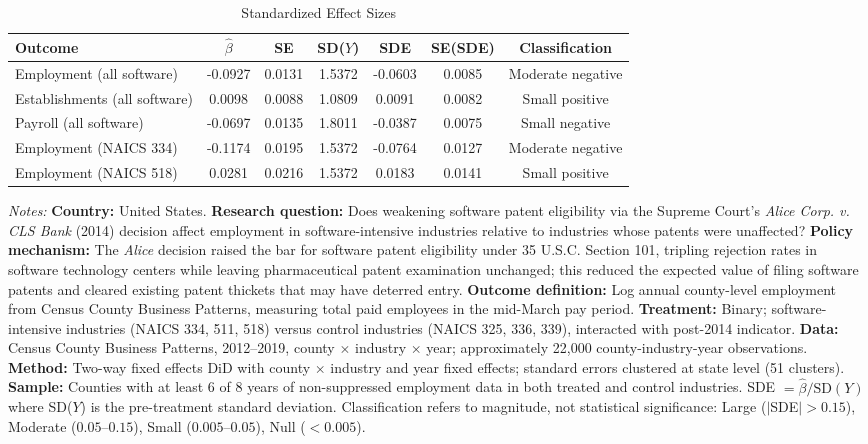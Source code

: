 \begin{table}[t]
\centering
\caption{Standardized Effect Sizes}
\label{tab:sde}
\footnotesize
\begin{tabular}{lcccccc}
\toprule
Outcome & $\hat{\beta}$ & SE & SD($Y$) & SDE & SE(SDE) & Classification \\
\midrule
Employment (all software) & -0.0927 & 0.0131 & 1.5372 & -0.0603 & 0.0085 & Moderate negative \\
Establishments (all software) & 0.0098 & 0.0088 & 1.0809 & 0.0091 & 0.0082 & Small positive \\
Payroll (all software) & -0.0697 & 0.0135 & 1.8011 & -0.0387 & 0.0075 & Small negative \\
Employment (NAICS 334) & -0.1174 & 0.0195 & 1.5372 & -0.0764 & 0.0127 & Moderate negative \\
Employment (NAICS 518) & 0.0281 & 0.0216 & 1.5372 & 0.0183 & 0.0141 & Small positive \\
\bottomrule
\end{tabular}
\begin{tablenotes}
\item \textit{Notes:} \textbf{Country:} United States. \textbf{Research question:} Does weakening software patent eligibility via the Supreme Court's \textit{Alice Corp. v. CLS Bank} (2014) decision affect employment in software-intensive industries relative to industries whose patents were unaffected? \textbf{Policy mechanism:} The \textit{Alice} decision raised the bar for software patent eligibility under 35 U.S.C. Section 101, tripling rejection rates in software technology centers while leaving pharmaceutical patent examination unchanged; this reduced the expected value of filing software patents and cleared existing patent thickets that may have deterred entry. \textbf{Outcome definition:} Log annual county-level employment from Census County Business Patterns, measuring total paid employees in the mid-March pay period. \textbf{Treatment:} Binary; software-intensive industries (NAICS 334, 511, 518) versus control industries (NAICS 325, 336, 339), interacted with post-2014 indicator. \textbf{Data:} Census County Business Patterns, 2012--2019, county $\times$ industry $\times$ year; approximately 22,000 county-industry-year observations. \textbf{Method:} Two-way fixed effects DiD with county $\times$ industry and year fixed effects; standard errors clustered at state level (51 clusters). \textbf{Sample:} Counties with at least 6 of 8 years of non-suppressed employment data in both treated and control industries. SDE $= \hat{\beta} / \text{SD}(Y)$ where SD($Y$) is the pre-treatment standard deviation. Classification refers to magnitude, not statistical significance: Large ($|$SDE$| > 0.15$), Moderate ($0.05$--$0.15$), Small ($0.005$--$0.05$), Null ($< 0.005$).
\end{tablenotes}
\end{table}
